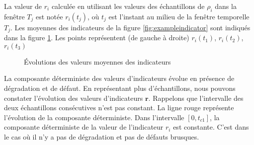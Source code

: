 \documentclass{article}
\begin{document}
La valeur de $r_i$ calculée en utilisant les valeurs des échantillons de $\rho_i$ dans la fenêtre $T_j$ est notée $r_i(t_j)$, où $t_j$ est l'instant au milieu de la fenêtre temporelle $T_j$.
Les moyennes des indicateurs de la figure \ref{fig:exampleindicator} sont indiqués dans la figure \ref{fig:exampleindicateurmoyen}. Les points représentent (de gauche à droite) $r_i(t_1)$, $r_i(t_2)$, $r_i(t_3)$




  

\begin{figure}[H]
\centering
{}
\caption{Évolutions des valeurs moyennes des indicateurs}
\label{fig:exampleindicateurmoyen}
\end{figure}

La composante déterministe des valeurs d'indicateurs évolue en présence de dégradation et de défaut. 
En représentant plus d'échantillons, nous pouvons constater l'évolution des valeurs d'indicateurs $\mathbf{r}$. 
Rappelons que l'intervalle des deux échantillons consécutives n'est pas constant. 
La ligne rouge représente l'évolution de la composante déterministe. 
Dans l'intervalle $\left[0,t_{c1}\right]$, la composante déterministe de la valeur de l'indicateur $r_i$ est constante.
C'est dans le cas où il n'y a pas de dégradation et pas de défauts brusques. 
\end{document}
